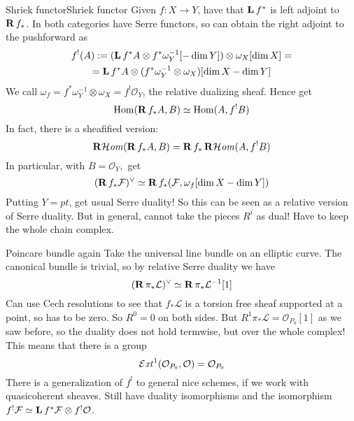 \begin{example}{Shriek functor}{Shriek functor} Given $f:X\rightarrow Y$, have that $\operatorname{\mathbf{L}} f^*$ is left adjoint to $\operatorname{\mathbf{R}} f_{*}$. In both categories have Serre functors, so can obtain the right adjoint to the pushforward as $$\begin{gathered}
f^!(A):=(\operatorname{\mathbf{L}} f^*A\otimes f^*\omega_{Y}^{-1}[-\dim Y])\otimes \omega_{X}[\dim X]=\\=\operatorname{\mathbf{L}} f^*A\otimes (f^*\omega_{Y}^{-1}\otimes \omega_{X})[\dim X -\dim Y]\end{gathered}$$
We call $\omega_{f}=f^*\omega_{Y}^{-1}\otimes \omega_{X}=f^!\mathcal{O}_{Y}$, the relative dualizing sheaf. Hence get $$\mathrm{Hom}(\operatorname{\mathbf{R}} f_{*}A, B)\simeq \mathrm{Hom}(A, f^!B)$$
In fact, there is a sheafified version: $$\operatorname{\mathbf{R}\mathcal{H}\mathit{om}}(\operatorname{\mathbf{R}} f_{*}A,B)=\operatorname{\mathbf{R}} f_{*}\operatorname{\mathbf{R}\mathcal{H}\mathit{om}}(A,f^!B)$$
In particular, with $B=\mathcal{O}_{Y},$ get $$(\operatorname{\mathbf{R}} f_{*}\mathcal{F})^\lor\simeq \operatorname{\mathbf{R}} f_{*}(\mathcal{F}, \omega_{f}[\dim X-\dim Y])$$
Putting $Y=pt$, get usual Serre duality! So this can be seen as a relative version of Serre duality. But in general, cannot take the pieces $R^i$ as dual! Have to keep the whole chain complex.
\end{example}

\begin{example}{Poincare bundle again}{} Take the universal line bundle on an elliptic curve. The canonical bundle is trivial, so by relative Serre duality we have $$(\operatorname{\mathbf{R}} \pi_{*}\mathcal{L})^\lor\simeq \operatorname{\mathbf{R}} \pi_{*}\mathcal{L}^{-1}[1]$$Can use Cech resolutions to see that $f_*\mathcal{L}$ is a torsion free sheaf supported at a point, so has to be zero. So $R^0=0$ on both sides. But $R^1\pi_{*}\mathcal{L}=\mathcal{O}_{P_{0}}[1]$ as we saw before, so the duality does not hold termwise, but over the whole complex! This means that there is a group $$\operatorname{\mathcal{E}\mathit{xt}}^1(\mathcal{O}_{P_{0}}, \mathcal{O})=\mathcal{O}_{P_{0}}$$There is a generalization of $f^!$ to general nice schemes, if we work with quasicoherent sheaves. Still have duality isomorphisms and the isomorphism $f^!\mathcal{F}\simeq \operatorname{\mathbf{L}} f^*\mathcal{F}\otimes f^!\mathcal{O}$. \end{example}


